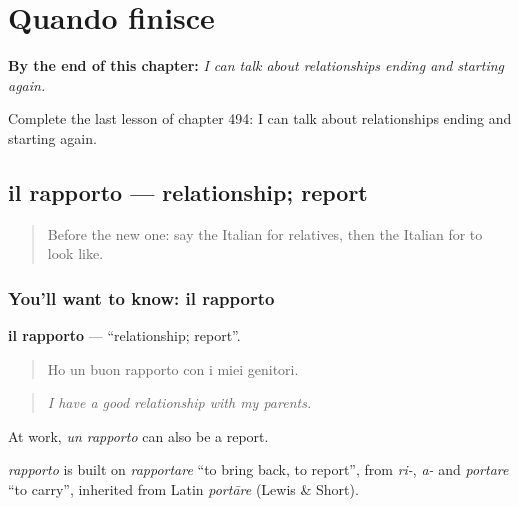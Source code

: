 
\chapter{Quando finisce}
\label{ch:it-quando-finisce}

\begin{chapteropening}
\textbf{By the end of this chapter:} \emph{I can talk about relationships ending and starting again.}

Complete the last lesson of chapter 494: I can talk about relationships ending and starting again.
\end{chapteropening}

\section[il rapporto]{il rapporto — relationship; report}

\label{lesson:IT-C494-rapporto}



\begin{quote}
Before the new one: say the Italian for relatives, then the Italian for to look like.
\end{quote}

\subsection*{You'll want to know: il rapporto}
\textbf{il rapporto} — \textquotedblleft{}relationship; report\textquotedblright{}.

\begin{quote}
Ho un buon rapporto con i miei genitori.
\end{quote}

\begin{quote}
\emph{I have a good relationship with my parents.}
\end{quote}

At work, \emph{un rapporto} can also be a report.

\begin{cousinweb}
\emph{rapporto} is built on \emph{rapportare} \textquotedblleft{}to bring back, to report\textquotedblright{}, from \emph{ri-}, \emph{a-} and \emph{portare} \textquotedblleft{}to carry\textquotedblright{}, inherited from Latin \emph{portāre} (Lewis \& Short).
\end{cousinweb}

